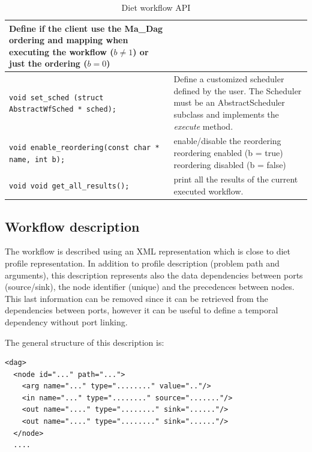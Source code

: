 \begin{table}[htbp]
\begin{tabular}[htbp]{|p{8cm}|p{7.5cm}|}
    Define if the client use the Ma\_Dag ordering and mapping when
    executing the workflow ($b\neq1$) or just the ordering ($b=0$)
    \\\hline
    \texttt{void  \newline
      set\_sched (struct AbstractWfSched * sched);}&
    Define a customized scheduler defined by the user. The Scheduler
    must be an AbstractScheduler subclass and implements the
    \textit{execute} method.
    \\\hline
    \texttt{void \newline
      enable\_reordering(const char * name, int b);
    }
    & 
    enable/disable the reordering \newline
    reordering enabled (b = true) \newline
    reordering disabled (b = false)
    \\\hline
    \texttt{void \newline
      void get\_all\_results();}
    &
    print all the results of the current executed workflow.
    \\\hline
  \end{tabular}
  \caption{Diet workflow API}
  \label{tab::wf_api}
\end{table}


\subsection{Workflow description}
\label{sec:workflow_desc}

The workflow is described using an XML representation which is close
to diet profile representation. In addition to profile description
(problem path and arguments), this description represents also the
data dependencies between ports (source/sink), the node identifier
(unique) and the precedences between nodes. This last information can
be removed since it can be retrieved from the dependencies between
ports, however it can be useful to define a temporal dependency
without port linking.

The general structure of this description is:

\begin{verbatim}
<dag>
  <node id="..." path="...">
    <arg name="..." type="........" value=".."/>
    <in name="..." type="........" source="......."/>
    <out name="...." type="........" sink="......"/>
    <out name="...." type="........" sink="......"/>
  </node>
  ....
\end{verbatim}

